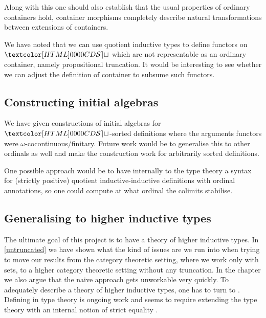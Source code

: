 Along with this one should also establish that the usual properties of
ordinary containers hold, \ie container morphisms completely describe
natural transformations between extensions of containers.

We have noted that we can use quotient inductive types to define
functors on $\SET$ which are not representable as an ordinary
container, namely propositional truncation. It would be interesting to
see whether we can adjust the definition of container to subsume such
functors.

\subsection{Constructing initial algebras}

We have given constructions of initial algebras for $\SET$-sorted
definitions where the arguments functors were
$\omega$-cocontinuous/finitary. Future work would be to generalise
this to other ordinals as well and make the construction work for
arbitrarily sorted definitions.

One possible approach would be to have internally to the type theory a
syntax for (strictly positive) quotient inductive-inductive
definitions with ordinal annotations, so one could compute at what
ordinal the colimits stabilise.

\subsection{Generalising to higher inductive types}

The ultimate goal of this project is to have a theory of higher
inductive types. In \cref{untruncated} we have shown what the kind of
issues are we run into when trying to move our results from the
category theoretic setting, where we work only with sets, to a higher
category theoretic setting without any truncation. In the chapter we
also argue that the naive approach gets unworkable very quickly. To
adequately describe a theory of higher inductive types, one has to
turn to \inftycats. Defining \inftycats in type theory is ongoing work
and seems to require extending the type theory with an internal notion
of strict equality \cite{Altenkirch2016,Altenkirch2016iii}.
